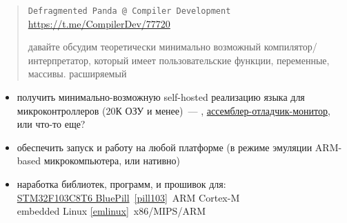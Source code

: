 \clearpage
{}\label{embed}\secdown
\clearpage



\begin{quotation}
\noindent
\verb|Defragmented Panda @ Compiler Development|\\
\url{https://t.me/CompilerDev/77720}
    
\noindent
давайте обсудим теоретически минимально возможный компилятор/интерпретатор,
который имеет пользовательские функции, переменные, массивы. расширяемый
\end{quotation}

\begin{itemize}
    \item получить минимально-возможную self-hosted реализацию языка для
    микроконтроллеров (20К ОЗУ и менее)\ --- \F,
    \href{http://www.danbigras.ru/RK86/Programm/SoftWare.html}{ассемблер-отладчик-монитор},
    или что-то еще?
    \item обеспечить запуск и работу на любой платформе (в режиме эмуляции
    ARM-based микрокомпьютера, или нативно)
    \item наработка библиотек, программ, и прошивок для:\\
    \href{https://aliexpress.ru/item/32581820854.html}{STM32F103C8T6 BluePill}\ \ref{pill103}\ ARM Cortex-M\\
    embedded Linux \ref{emlinux}\ x86/MIPS/ARM
\end{itemize}








\secup
